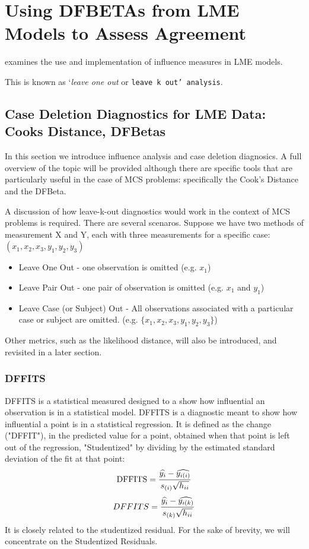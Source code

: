 \documentclass[12pt, a4paper]{report}
\theoremstyle{plain}
\theoremstyle{definition}
\theoremstyle{remark}
\begin{document}
	
	
	


	\section{Using DFBETAs from LME Models to Assess Agreement}
	
	
	\citet{schabenberger} examines the use and implementation of influence measures in LME models.

	
	
	
	This is known as `\textit{leave one out} or \texttt{leave k
		out' analysis}.
	
	
	
	
	
	
	\subsection*{Case Deletion Diagnostics for LME Data: Cooks Distance, DFBetas}
	In this section we introduce influence analysis and case deletion diagnosics. A full overview of the topic will be provided although there are specific tools that are particularly useful in the case of MCS problems: specifically the Cook's Distance and the DFBeta.
	
	A discussion of how leave-k-out diagnostics would work in the context of MCS problems is required. There are several scenaros. Suppose we have two methods of measurement X and Y, each with three measurements for a specific case: $(x_1,x_2,x_3,y_1,y_2,y_3)$
	
	\begin{itemize}
		\item Leave One Out - one observation is omitted (e.g. $x_1$)
		\item Leave Pair Out - one pair of observation  is omitted (e.g. $x_1$ and $y_1$)
		\item Leave Case (or Subject) Out - All observations associated with a particular case or subject are omitted. (e.g. $\{x_1,x_2,x_3,y_1,y_2,y_3\}$)
	\end{itemize}
	Other metrics, such as the likelihood distance, will also be introduced, and revisited in a later section.


	\subsubsection{DFFITS} %
	DFFITS is a statistical measured designed to a show how influential an observation is in a statistical model. DFFITS is a diagnostic meant to show how influential a point is in a statistical regression. It is defined as the change ("DFFIT"), in the predicted value for a point, obtained when that point is left out of the regression, "Studentized" by dividing by the estimated standard deviation of the fit at that point:
	\[ \mbox{DFFITS} = {\widehat{y_i} - \widehat{y_{i(i)}} \over s_{(i)} \sqrt{h_{ii}}}\]
	\begin{displaymath} DFFITS = {\widehat{y_i} -
		\widehat{y_{i(k)}} \over s_{(k)} \sqrt{h_{ii}}} \end{displaymath}
	It is closely related to the studentized residual. For the sake of brevity, we will concentrate on the Studentized Residuals.
	
\end{document}
